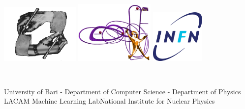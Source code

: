 \documentclass[final]{beamer}
\begin{document}
\begin{frame}{}
\begin{textblock}{30}
\begin{minipage}[t]{20cm}
      \hspace{20pt}
      \vspace{5pt}\includegraphics[width=110pt]{figures/lacam}
      \hspace{20pt}
      \includegraphics[width=110pt]{figures/fisicalogo}
      \hspace{25pt}
      \includegraphics[width=75pt]{figures/infn}
    \end{minipage}\\
    \begin{minipage}[t]{20cm}
    \vspace{15pt}
    \scriptsize
    University of Bari - Department of Computer Science - Department
    of Physics\\[4pt]
    LACAM Machine Learning Lab\hspace{50pt}National Institute for Nuclear Physics
    \end{minipage}\hspace{10pt}
  \end{textblock}

\end{frame}
\end{document}
